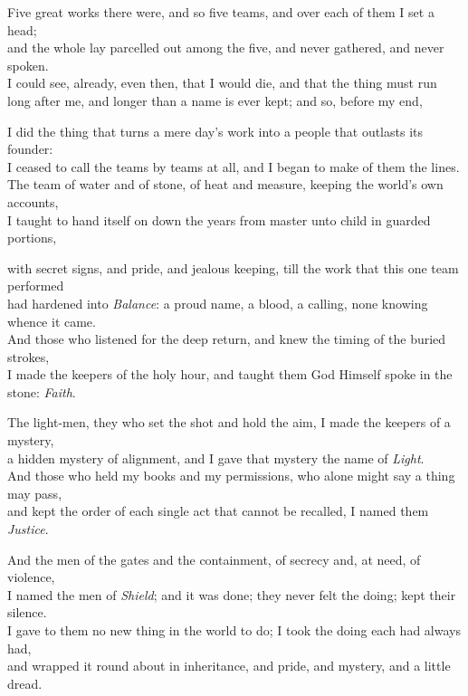 \begin{scripture}
Five great works there were, and so five teams, and over each of them I set a head; \\
and the whole lay parcelled out among the five, and never gathered, and never spoken. \\
I could see, already, even then, that I would die, and that the thing must run \\
long after me, and longer than a name is ever kept; and so, before my end, \\
\medskip

I did the thing that turns a mere day's work into a people that outlasts its founder: \\
I ceased to call the teams by teams at all, and I began to make of them the lines. \\
The team of water and of stone, of heat and measure, keeping the world's own accounts, \\
I taught to hand itself on down the years from master unto child in guarded portions, \\
\medskip

with secret signs, and pride, and jealous keeping, till the work that this one team performed \\
had hardened into \emph{Balance}: a proud name, a blood, a calling, none knowing whence it came. \\
And those who listened for the deep return, and knew the timing of the buried strokes, \\
I made the keepers of the holy hour, and taught them God Himself spoke in the stone: \emph{Faith}. \\
\medskip

The light-men, they who set the shot and hold the aim, I made the keepers of a mystery, \\
a hidden mystery of alignment, and I gave that mystery the name of \emph{Light}. \\
And those who held my books and my permissions, who alone might say a thing may pass, \\
and kept the order of each single act that cannot be recalled, I named them \emph{Justice}. \\
\medskip

And the men of the gates and the containment, of secrecy and, at need, of violence, \\
I named the men of \emph{Shield}; and it was done; they never felt the doing; kept their silence. \\
I gave to them no new thing in the world to do; I took the doing each had always had, \\
and wrapped it round about in inheritance, and pride, and mystery, and a little dread. \\
\medskip


\end{scripture}
